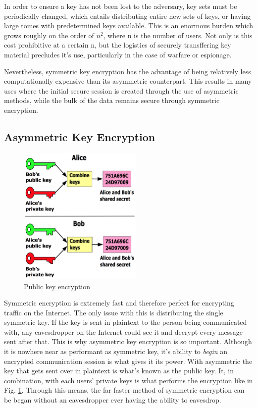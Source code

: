 \documentclass[journal]{IEEEtran}
\begin{document}
In order to ensure a key has not been lost to the adversary, key sets must be periodically changed, which entails distributing entire new sets of keys, or having large tomes with predetermined keys available.  This is an enormous burden which grows roughly on the order of $n^2$, where n is the number of users.  Not only is this cost prohibitive at a certain n, but the logistics of securely transffering key material precludes it's use, particularly in the case of warfare or espionage.

Nevertheless, symmetric key encryption has the advantage of being relatively less computationally expensive than its asymmetric counterpart.  This results in many uses where the initial secure session is created through the use of asymmetric methods, while the bulk of the data remains secure through symmetric encryption.

\subsection{Asymmetric Key Encryption}

\begin{figure}[htbp]
	\centering
	\includegraphics[width=6cm,keepaspectratio]{img/crypto1.png}
	\caption{Public key encryption \cite{KeyFigure} }
	\label{pubenc}
\end{figure}

Symmetric encryption is extremely fast and therefore perfect for encrypting traffic on the Internet.  The only issue with this is distributing the single symmetric key.  If the key is sent in plaintext to the person being communicated with, any eavesdropper on the Internet could see it and decrypt every message sent after that.  This is why asymmetric key encryption is so important.  Although it is nowhere near as performant as symmetric key, it's ability to \emph{begin} an encrypted communication session is what gives it its power.  With asymmetric the key that gets sent over in plaintext is what's known as the public key.  It, in combination, with each users' private keys is what performs the encryption like in Fig. \ref{pubenc}.  Through this means, the far faster method of symmetric encryption can be began without an eavesdropper ever having the ability to eavesdrop.
\end{document}
